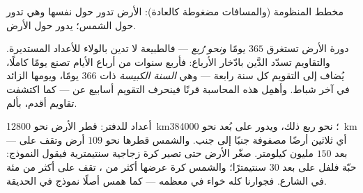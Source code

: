 \begin{omfigure}

{\small مخطط المنظومة (والمسافات مضغوطة كالعادة): الأرض تدور حول
نفسها وهي تدور حول الشمس؛  يدور حول الأرض.}
\end{omfigure}

\begin{example}\label{ex:g6:sun-earth-moon:leap}
دورة الأرض تستغرق $365$ يومًا \emph{ونحو رُبع} --- فالطبيعة لا
تدين بالولاء للأعداد المستديرة. والتقاويم تسدّد الدَّين بادّخار
الأرباع: فأربع سنوات من أرباع الأيام تصنع يومًا كاملًا، يُضاف
إلى التقويم كل سنة رابعة --- وهي \emph{السنة الكبيسة} ذات
$366$ يومًا، ويومها الزائد في آخر شباط. وأهمِل هذه المحاسبة قرنًا
فينحرف التقويم أسابيع عن  --- كما اكتشفت تقاويم أقدم،
بألم.
\end{example}

\begin{example}\label{ex:g6:sun-earth-moon:scale}
أعداد للدفتر: قطر الأرض نحو \qty{12800}{km}؛  نحو ربع
ذلك، ويدور على بُعد نحو \qty{384000}{km} --- أي ثلاثين أرضًا
مصفوفة جنبًا إلى جنب. والشمس قطرها نحو $109$ أرض وتقف على بعد
$150$ مليون كيلومتر. صغّر الأرض حتى تصير كرة زجاجية سنتيمترية
فيقول النموذج:  حبّة فلفل على بعد $30$ سنتيمترًا؛ والشمس
كرة عرضها أكثر من ، تقف على أكثر من مئة  في الشارع.
فجوارنا كله خواء في معظمه --- كما همس أصلًا نموذج  في الحديقة.
\end{example}

